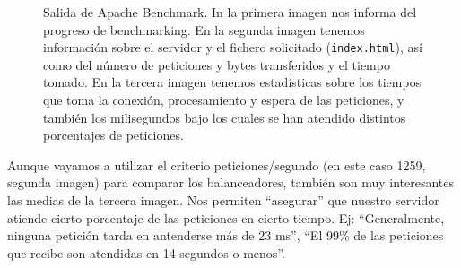 \documentclass{article}
\begin{document}
\begin{figure}[H]
	\centering
\end{figure}\begin{figure}[H]\ContinuedFloat
	\caption{Salida de Apache Benchmark. In la primera imagen nos informa del progreso de benchmarking. En
	la segunda imagen tenemos información sobre el servidor y el fichero solicitado (\texttt{index.html}), así como
del número de peticiones y bytes transferidos y el tiempo tomado. En la tercera imagen tenemos estadísticas sobre
los tiempos que toma la conexión, procesamiento y espera de las peticiones, y también los milisegundos bajo los cuales
se han atendido distintos porcentajes de peticiones.}
	\label{fig:ab}
\end{figure}
Aunque vayamos a utilizar el criterio peticiones/segundo (en este caso 1259, segunda imagen) para comparar los balanceadores, 
también son muy interesantes
las medias de la tercera imagen. Nos permiten ``asegurar'' que nuestro servidor atiende cierto porcentaje de las peticiones
en cierto tiempo. Ej: ``Generalmente, ninguna petición tarda en antenderse más de 23 ms'',
``El 99\% de las peticiones que recibe son atendidas en 14 segundos o menos''.
\end{document}
